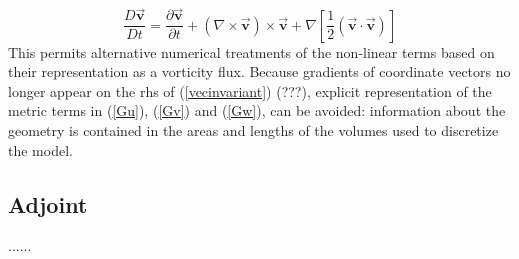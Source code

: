 \begin{equation}
\frac{D\vec{\mathbf{v}}}{Dt}=\frac{\partial \vec{\mathbf{v}}}{\partial t}%
+\left( \nabla \times \vec{\mathbf{v}}\right) \times \vec{\mathbf{v}}+\nabla
\left[ \frac{1}{2}(\vec{\mathbf{v}}\cdot \vec{\mathbf{v}})\right] 
\label{vecinvariant}
\end{equation}
This permits alternative numerical treatments of the non-linear terms based
on their representation as a vorticity flux. Because gradients of coordinate
vectors no longer appear on the rhs of (\ref{vecinvariant}) (???), explicit
representation of the metric terms in (\ref{Gu}), (\ref{Gv}) and (\ref{Gw}),
can be avoided: information about the geometry is contained in the areas and
lengths of the volumes used to discretize the model.

\subsection{Adjoint}

......
